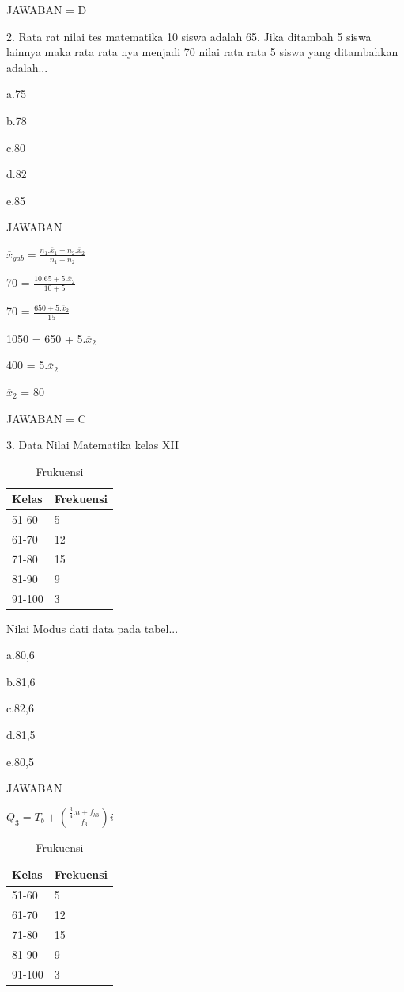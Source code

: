 \documentclass[11pt,fleqn]{book} %
\begin{document}
{JAWABAN = D

2. Rata rat nilai tes matematika 10 siswa adalah 65. Jika ditambah 5 siswa lainnya maka rata rata nya menjadi 70 nilai rata rata 5 siswa yang ditambahkan adalah...


a.75

b.78

c.80

d.82

e.85

JAWABAN 

$\overline{x}_{gab}= \frac{n_{1}.\overline{x}_{1} + n_{2}.\overline{x}_{2}}{n_{1} + n_{2}}$

70 = $\frac{10.65 + 5.\overline{x}_{2}}{10+5} $

70 = $\frac{650 + 5.\overline{x}_{2}}{15} $

1050 = 650 + 5.$ \overline{x}_{2}$

400 = 5.$\overline{x}_{2}$

$\overline{x}_{2}$ = 80

JAWABAN = C

3. Data Nilai Matematika kelas XII
\begin{table}[h]
\centering
\begin{tabular}{l l}
\toprule
\textbf{Kelas} & \textbf{Frekuensi}\\
\midrule
51-60 & 5  \\
61-70 & 12 \\
71-80 & 15\\
81-90 & 9 \\
91-100 & 3 \\
\bottomrule
\end{tabular}
\caption{Frukuensi}
\end{table}
Nilai Modus dati data pada tabel...


a.80,6

b.81,6

c.82,6

d.81,5

e.80,5

JAWABAN 

$Q_{3} = T_{b} + (\frac{\frac{3}{4}.n + f_{k3}}{f_{3}})i$

\begin{table}[h]
\centering
\begin{tabular}{l l}
\toprule
\textbf{Kelas} & \textbf{Frekuensi}\\
\midrule
51-60 & 5  \\
61-70 & 12 \\
71-80 & 15\\
81-90 & 9 \\
91-100 & 3 \\
\bottomrule
\end{tabular}
\caption{Frukuensi}
\end{table}

}
\end{document}
